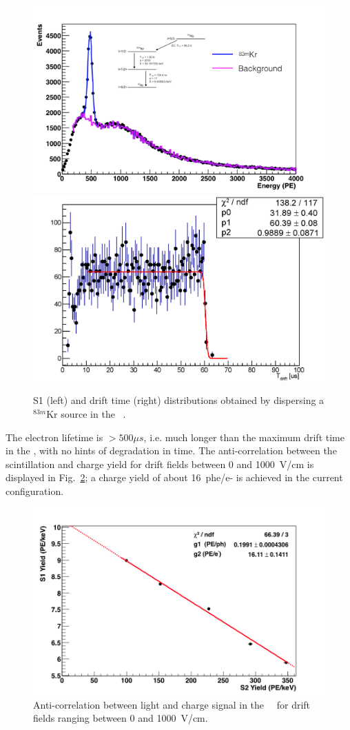 \begin{figure}[tbp!]
\centering
\includegraphics[width=0.46\columnwidth]{./Figures/kr_973.png}
\includegraphics[width=0.44\columnwidth]{./Figures/Kr_standardField_TdriftFit.png}
\caption[\ReD\ \TPC\ spatial uniformity with $^{83m}$Kr]{S1 (left) and drift time (right) distributions 
obtained by dispersing a $^{83m}$Kr source in the \ReD\ \TPC.}
\label{fig:ReDUniformity}
\end{figure}
%
The electron lifetime is $> 500 \mu s$, i.e. much longer than the maximum drift time in the \TPC, 
with no hints of degradation in time. The anti-correlation between the scintillation and charge yield 
for drift fields between 0 and 1000~V/cm is displayed in Fig.~\ref{fig:reddoke}; a charge 
yield of about 16~phe/e- is achieved in the current configuration. \\
\begin{figure}[tbp!]
\centering
\includegraphics[width=0.6\columnwidth]{./Figures/asy_s1_s2_finale_s2fitmod_no0.png}
\caption[\SOne-\STwo\ anti-correlation in \ReD]{Anti-correlation between light and charge signal in the 
\ReD\ \TPC\ for drift fields ranging between 0 and 1000~V/cm.}
\label{fig:reddoke}
\end{figure}

